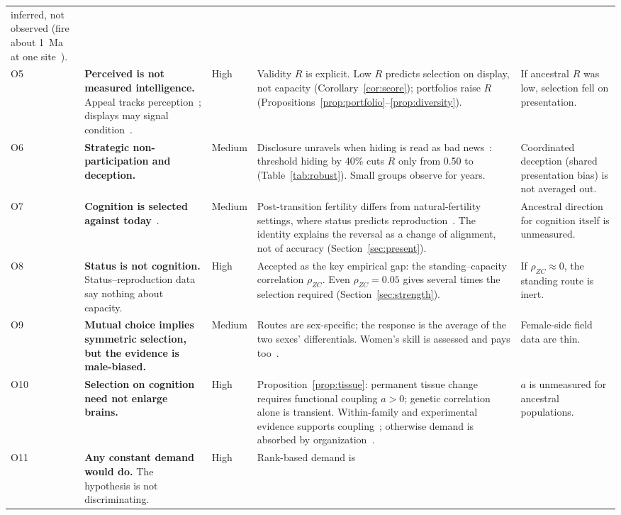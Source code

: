 \begin{table}[tp]
\begin{tabularx}{\textwidth}{@{}P{0.028\textwidth}P{0.225\textwidth}P{0.05\textwidth}LP{0.19\textwidth}@{}}
inferred, not observed (fire about 1~Ma at one site~\cite{berna2012}).\\
O5 & \textbf{Perceived is not measured intelligence.} Appeal tracks perception~\cite{driebe2021}; displays may signal
condition~\cite{baroudagues2025}. & High & Validity $R$ is explicit. Low $R$ predicts selection on display, not capacity
(Corollary~\ref{cor:score}); portfolios raise $R$ (Propositions~\ref{prop:portfolio}--\ref{prop:diversity}). & If ancestral
$R$ was low, selection fell on presentation.\\
O6 & \textbf{Strategic non-participation and deception.} & Medium & Disclosure unravels when hiding is read as bad
news~\cite{milgrom1981}: threshold hiding by 40\% cuts $R$ only from 0.50 to \HideThr{} (Table~\ref{tab:robust}). Small groups
observe for years. & Coordinated deception (shared presentation bias) is not averaged out.\\
O7 & \textbf{Cognition is selected against today}~\cite{kong2017}. & Medium & Post-transition fertility differs from
natural-fertility settings, where status predicts reproduction~\cite{vonrueden2016}. The identity explains the reversal as a
change of alignment, not of accuracy (Section~\ref{sec:present}). & Ancestral direction for cognition itself is unmeasured.\\
O8 & \textbf{Status is not cognition.} Status--reproduction data say nothing about capacity. & High & Accepted as the key
empirical gap: the standing--capacity correlation $\rho_{ZC}$. Even $\rho_{ZC}=0.05$ gives several times the selection
required (Section~\ref{sec:strength}). & If $\rho_{ZC}\approx0$, the standing route is inert.\\
O9 & \textbf{Mutual choice implies symmetric selection, but the evidence is male-biased.} & Medium & Routes are
sex-specific; the response is the average of the two sexes' differentials. Women's skill is assessed and pays
too~\cite{smith2017,marlowe2004,mcdade2007}. & Female-side field data are thin.\\
O10 & \textbf{Selection on cognition need not enlarge brains.} & High & Proposition~\ref{prop:tissue}: permanent tissue change
requires functional coupling $a>0$; genetic correlation alone is transient. Within-family and experimental evidence supports
coupling~\cite{lee2019,kotrschal2013}; otherwise demand is absorbed by organization~\cite{neubauer2018}. & $a$ is unmeasured
for ancestral populations.\\
O11 & \textbf{Any constant demand would do.} The hypothesis is not discriminating. & High & Rank-based demand is

\end{tabularx}
\end{table}

